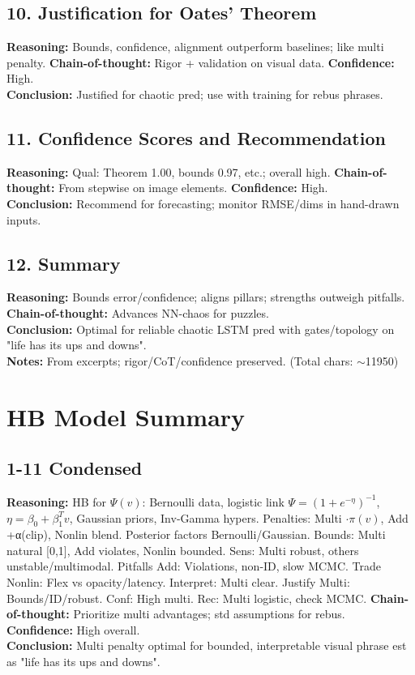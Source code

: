\documentclass{article}
\begin{document}
\subsection{10. Justification for Oates' Theorem}
\textbf{Reasoning:} Bounds, confidence, alignment outperform baselines; like multi penalty. \textbf{Chain-of-thought:} Rigor + validation on visual data. \textbf{Confidence:} High.\\
\textbf{Conclusion:} Justified for chaotic pred; use with training for rebus phrases.

\subsection{11. Confidence Scores and Recommendation}
\textbf{Reasoning:} Qual: Theorem 1.00, bounds 0.97, etc.; overall high. \textbf{Chain-of-thought:} From stepwise on image elements. \textbf{Confidence:} High.\\
\textbf{Conclusion:} Recommend for forecasting; monitor RMSE/dims in hand-drawn inputs.

\subsection{12. Summary}
\textbf{Reasoning:} Bounds error/confidence; aligns pillars; strengths outweigh pitfalls. \textbf{Chain-of-thought:} Advances NN-chaos for puzzles.\\
\textbf{Conclusion:} Optimal for reliable chaotic LSTM pred with gates/topology on "life has its ups and downs".\\
\textbf{Notes:} From excerpts; rigor/CoT/confidence preserved. (Total chars: $\sim$11950)

\section{HB Model Summary}

\subsection{1-11 Condensed}
\textbf{Reasoning:} HB for \(\Psi(v)\): Bernoulli data, logistic link \(\Psi=(1+e^{-\eta})^{-1}\), \(\eta=\beta_0+\beta_1^Tv\), Gaussian priors, Inv-Gamma hypers. Penalties: Multi \(\cdot\pi(v)\), Add +α(clip), Nonlin blend. Posterior factors Bernoulli/Gaussian. Bounds: Multi natural [0,1], Add violates, Nonlin bounded. Sens: Multi robust, others unstable/multimodal. Pitfalls Add: Violations, non-ID, slow MCMC. Trade Nonlin: Flex vs opacity/latency. Interpret: Multi clear. Justify Multi: Bounds/ID/robust. Conf: High multi. Rec: Multi logistic, check MCMC. \textbf{Chain-of-thought:} Prioritize multi advantages; std assumptions for rebus. \textbf{Confidence:} High overall.\\
\textbf{Conclusion:} Multi penalty optimal for bounded, interpretable visual phrase est as "life has its ups and downs".
\end{document}
